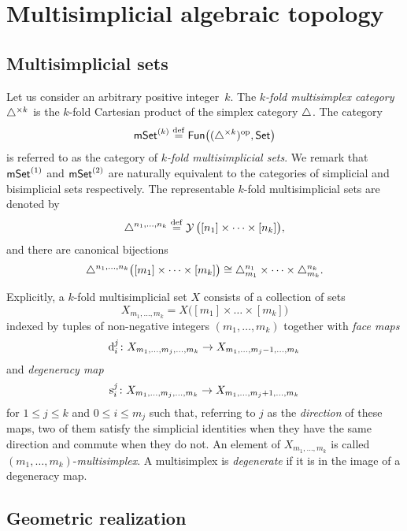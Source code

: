 
\section{Multisimplicial algebraic topology} \label{s:multisimplicial}

\subsection{Multisimplicial sets} \label{ss:multisimplicial sets}

Let us consider an arbitrary positive integer~$k$.
The \textit{$k$-fold multisimplex category} $\triangle^{\times k}$ is the $k$-fold Cartesian product of the simplex category $\triangle$.
The category
\[
\mathsf{mSet}^{(k)} \stackrel{\mathrm{def}}{=} \mathsf{Fun}\big((\triangle^{\times k})^{\mathrm{op}}, \mathsf{Set}\big)
\]
is referred to as the category of \textit{$k$-fold multisimplicial sets}.
We remark that $\mathsf{mSet}^{(1)}$ and $\mathsf{mSet}^{(2)}$ are naturally equivalent to the categories of simplicial and bisimplicial sets respectively.
The representable $k$-fold multisimplicial sets are denoted by
\[
\triangle^{n_1,\dots,n_k} \stackrel{\mathrm{def}}{=}
\operatorname{\mathcal{Y}} \big([n_1]\times\dots\times[n_k]\big),
\]
and there are canonical bijections
\[
\triangle^{n_1,\dots,n_k} \big([m_1]\times\dots\times[m_k]\big) \cong
\triangle^{n_1}_{m_1}\times\dots\times\triangle^{n_k}_{m_k}.
\]

Explicitly, a $k$-fold multisimplicial set $X$ consists of a collection of sets
\[
X_{m_1,\dots,m_k} =
X \big( [m_1] \times\dots\times [m_k] \big)
\]
indexed by tuples of non-negative integers $(m_1,\dots,m_k)$ together with \textit{face maps}
\[
\operatorname{d}_i^j \colon
X_{m_1, \dots, m_j,\dots,m_k} \to
X_{m_1, \dots, m_j-1, \dots, m_k}
\]
and \textit{degeneracy map}
\[
\operatorname{s}^j_i \colon X_{m_1, \dots, m_j,\dots,m_k} \to X_{m_1, \dots, m_j+1, \dots, m_k}
\]
for $1 \leq j \leq k$ and $0 \leq i \leq m_j$ such that, referring to $j$ as the \textit{direction} of these maps, two of them satisfy the simplicial identities when they have the same direction and commute when they do not.
An element of $X_{m_1,\dots,m_k}$ is called
$(m_1,\dots,m_k)$-\textit{multisimplex}.
A multisimplex is \textit{degenerate} if it is in the image of a degeneracy map.

\subsection{Geometric realization} \label{ss:geometric realization}


